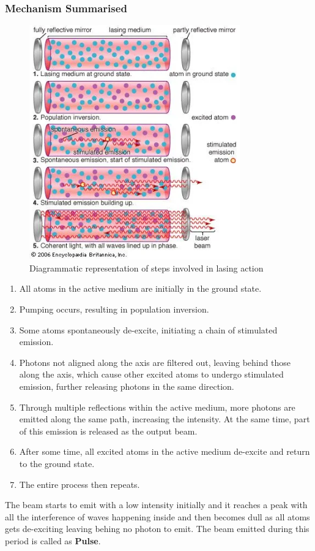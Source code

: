 \documentclass[12pt]{article}
\begin{document}
\subsubsection{Mechanism Summarised}

\begin{figure}[H]
    \centering
    \includegraphics[scale=1.2]{./img/08_working_of_laser.png}
    \caption{Diagrammatic representation of steps involved in lasing action}
\end{figure}

\begin{enumerate}[itemsep=0em]
    \item All atoms in the active medium are initially in the ground state.
    \item Pumping occurs, resulting in population inversion.
    \item Some atoms spontaneously de-excite, initiating a chain of stimulated emission.
    \item Photons not aligned along the axis are filtered out, leaving behind those along the axis, which cause other excited atoms to undergo stimulated emission, further releasing photons in the same direction.
    \item Through multiple reflections within the active medium, more photons are emitted along the same path, increasing the intensity. At the same time, part of this emission is released as the output beam.
    \item After some time, all excited atoms in the active medium de-excite and return to the ground state.
    \item The entire process then repeats.
\end{enumerate}

The beam starts to emit with a low intensity initially and it reaches a peak with all the interference of waves happening inside and then becomes dull as all atoms gets de-exciting leaving behing no photon to emit. The beam emitted during this period is called as \textbf{Pulse}.
\end{document}
